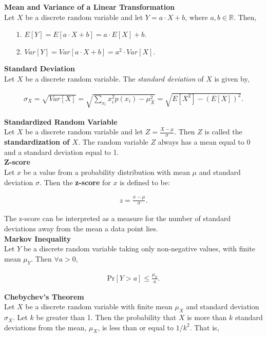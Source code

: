 \documentclass{article}
\numberwithin{theorem}{subsection}
\numberwithin{theorem}{subsubsection}
\numberwithin{lemma}{subsection}
\numberwithin{lemma}{subsubsection}
\theoremstyle{definition}
\numberwithin{definition}{subsection}
\numberwithin{definition}{subsubsection}
\begin{document}
\noindent \textbf{Mean and Variance of a Linear Transformation} \\
\indent Let $X$ be a discrete random variable and let $Y = a\cdot X + b$, where $a,b \in \mathbb{R}$. Then,
\begin{itemize}
    \item[1.] \quad $E[Y] = E[a\cdot X + b] = a\cdot E[X] + b$.
    \item[2.] \quad $Var[Y] = Var[a\cdot X + b] = a^2 \cdot Var[X]$. 
\end{itemize}

\noindent \textbf{Standard Deviation} \\
Let $X$ be a discrete random variable. The \textit{standard deviation} of $X$ is given by,

\begin{gather*}
    \sigma_{X} = \sqrt{Var[X]} = \sqrt{\sum_{x_{i}} x_{i}^{2} p(x_{i}) - \mu_{X}^{2}} = \sqrt{E[X^2] - (E[X])^2}.
\end{gather*}

\noindent \textbf{Standardized Random Variable} \\
\indent Let $X$ be a discrete random variable and let $Z = \frac{X - \mu}{\sigma}$. Then $Z$ is called the \textbf{standardization of $X$}. The random variable $Z$ always has a mean equal to 0 and a standard deviation equal to 1.
\\

\noindent \textbf{Z-score} \\
\indent Let $x$ be a value from a probability distribution with mean $\mu$ and standard deviation $\sigma$. Then the \textbf{z-score} for $x$ is defined to be:

\begin{gather*}
    z = \frac{x - \mu}{\sigma}.
\end{gather*}

The z-score can be interpreted as a measure for the number of standard deviations away from the mean a data point lies.\\

\noindent \textbf{Markov Inequality} \\
\indent Let $Y$ be a discrete random variable taking only non-negative values, with finite mean $\mu_{Y}$. Then $\forall a > 0$,

\begin{gather*}
    \text{Pr}[Y>a] \leq \frac{\mu_{Y}}{a}.
\end{gather*}

\noindent \textbf{Chebychev's Theorem}\\
Let $X$ be a discrete random variable with finite mean $\mu_{X}$ and standard deviation $\sigma_{X}$. Let $k$ be greater than 1. Then the probability that $X$ is more than $k$ standard deviations from the mean, $\mu_{X}$, is less than or equal to $1/k^2$. That is,
\end{document}

